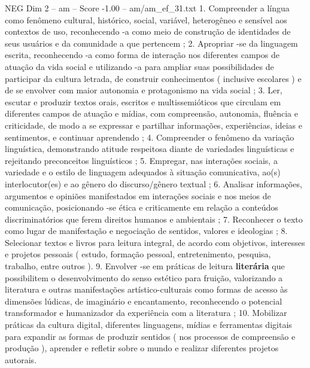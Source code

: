 \begin{textsample}{NEG Dim 2 – am – Score -1.00 – am/am\_ef\_31.txt}  \label{ex:f2_neg_139}
1.
Compreender a língua como fenômeno cultural, histórico, social, variável, heterogêneo e sensível aos contextos de uso, reconhecendo -a como meio de construção de identidades de seus usuários e da comunidade a que pertencem ; 2.
Apropriar -se da linguagem escrita, reconhecendo -a como forma de interação nos diferentes campos de atuação da vida social e utilizando -a para ampliar suas possibilidades de participar da cultura letrada, de construir conhecimentos ( inclusive escolares ) e de se envolver com maior autonomia e protagonismo na vida social ; 3.
Ler, escutar e produzir textos orais, escritos e multissemióticos que circulam em diferentes campos de atuação e mídias, com compreensão, autonomia, fluência e criticidade, de modo a se expressar e partilhar informações, experiências, ideias e sentimentos, e continuar aprendendo ; 4.
Compreender o fenômeno da variação linguística, demonstrando atitude respeitosa diante de variedades linguísticas e rejeitando preconceitos linguísticos ; 5.
Empregar, nas interações sociais, a variedade e o estilo de linguagem adequados à situação comunicativa, ao(s) interlocutor(es) e ao gênero do discurso/gênero textual ; 6.
Analisar informações, argumentos e opiniões manifestados em interações sociais e nos meios de comunicação, posicionando -se ética e criticamente em relação a conteúdos discriminatórios que ferem direitos humanos e ambientais ; 7.
Reconhecer o texto como lugar de manifestação e negociação de sentidos, valores e ideologias ; 8.
Selecionar textos e livros para leitura integral, de acordo com objetivos, interesses e projetos pessoais ( estudo, formação pessoal, entretenimento, pesquisa, trabalho, entre outros ). 9.
Envolver -se em práticas de leitura \textbf{literária} que possibilitem o desenvolvimento do senso estético para fruição, valorizando a literatura e outras manifestações artístico-culturais como formas de acesso às dimensões lúdicas, de imaginário e encantamento, reconhecendo o potencial transformador e humanizador da experiência com a literatura ; 10.
Mobilizar práticas da cultura digital, diferentes linguagens, mídias e ferramentas digitais para expandir as formas de produzir sentidos ( nos processos de compreensão e produção ), aprender e refletir sobre o mundo e realizar diferentes projetos autorais.

\end{textsample}
